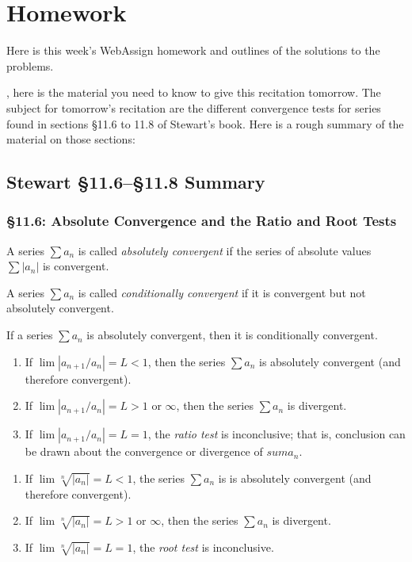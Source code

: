 \chapter{Homework}
Here is this week's WebAssign homework and outlines of the solutions to the
problems.

\bigskip

, here is the material you need to know to give this
recitation tomorrow. The subject for tomorrow's recitation are the
different convergence tests for series found in sections \S 11.6
to 11.8 of Stewart's book. Here is a rough summary of the material on those
sections:
\section*{Stewart \S 11.6--\S 11.8 Summary}
\subsection*{\S 11.6: Absolute Convergence and the Ratio and Root Tests}
\begin{definition}
A series $\sum a_n$ is called \emph{absolutely convergent} if the series of
absolute values $\sum |a_n|$ is convergent.
\end{definition}
\begin{definition}
A series $\sum a_n$ is called \emph{conditionally convergent} if it is
convergent but not absolutely convergent.
\end{definition}
\begin{theorem}
If a series $\sum a_n$ is absolutely convergent, then it is conditionally
convergent.
\end{theorem}
\begin{theorem}
\begin{enumerate}[label=\textnormal{(\roman*)},noitemsep]
\item If $\lim\left|a_{n+1}/a_n\right|=L<1$, then the series
  $\sum a_n$ is absolutely convergent (and therefore convergent).
\item If $\lim\left|a_{n+1}/a_n\right|=L>1$ or $\infty$, then the series
  $\sum a_n$ is divergent.
\item If $\lim\left|a_{n+1}/a_n\right|=L=1$, the \emph{ratio test} is
  inconclusive; that is, conclusion can be drawn about the convergence or
  divergence of $sum a_n$.
\end{enumerate}
\end{theorem}
\begin{theorem}
\begin{enumerate}[label=\textnormal{(\roman*)},noitemsep]
\item If $\lim\sqrt[n]{|a_n|}=L<1$, the series $\sum a_n$ is is absolutely
  convergent (and therefore convergent).
\item If $\lim\sqrt[n]{|a_n|}=L>1$ or $\infty$, then the series $\sum
  a_n$ is divergent.
\item If $\lim\sqrt[n]{|a_n|}=L=1$, the \emph{root test} is inconclusive.
\end{enumerate}
\end{theorem}
